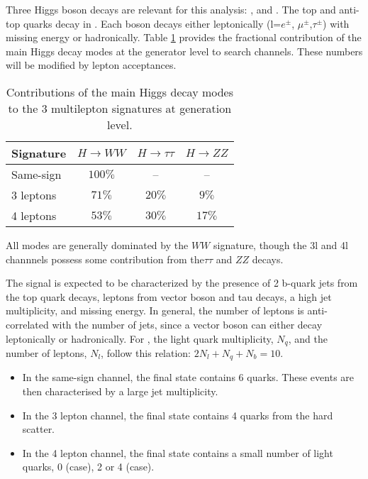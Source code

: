 Three Higgs boson decays are relevant for this analysis: \WW,
\twotau and \ZZ. The top and anti-top quarks decay  in
\Wb. Each \W boson decays either 
leptonically (l=$e^\pm$, $\mu^\pm$,$\tau^\pm$) with missing energy or hadronically. 
Table \ref{ana:table_decay} provides the fractional contribution of the main 
Higgs decay modes at the generator level to \tth search channels. These
numbers will be modified by lepton acceptances. 

\begin{table}[htbp]
  \begin{center} 
    \caption{Contributions of the main Higgs decay modes to the 3 multilepton
      \tth signatures at generation level.
      }\label{ana:table_decay} 
      \begin{tabular}{l|c|c|c} 
      \hline\hline
  Signature & $H \rightarrow WW$  & $H\rightarrow \tau\tau$  & $H \rightarrow
  ZZ$  \\\hline
  Same-sign &  $100\%$ & -- & -- \\
  3 leptons  &  $71\%$ & $20\%$ & $9\%$ \\
  4 leptons  &  $53\%$ & $30\%$ & $17\%$  \\
     \hline
    \end{tabular}
  \end{center}
\end{table}


All modes are generally dominated by the $WW$ signature, though the 3l and 4l
channnels possess some contribution from the$\tau\tau$ and $ZZ$ decays. 


The signal is expected to be characterized by the presence of 2 b-quark jets from
the top quark decays, leptons from vector boson and tau decays,
a high jet multiplicity, and missing energy. In general, the number of leptons is anti-correlated 
with the number of jets, since a vector boson can either decay leptonically 
or hadronically. For \hww, the light quark multiplicity, $N_q$, and the
number of leptons, $N_l$, follow this relation: $2N_l+N_q+N_b=10$.

\begin{itemize}
\item In the same-sign channel, the \tth final state contains 6 quarks. These events
are then characterised by a large jet multiplicity.

\item In the 3 lepton channel, the \tth final state contains 4 quarks from the hard scatter.

\item In the 4 lepton channel, the \tth final state contains a small number of light
quarks, 0 (\hww case), 2 or 4 (\hzz case).


\end{itemize} 

